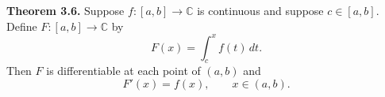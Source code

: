 \textbf{Theorem 3.6.}  Suppose $f: [a, b] \to \mathbb{C}$ is continuous and suppose $c \in [a, b]$. Define $F: [a, b] \to \mathbb{C}$ by
$$F(x) = \int_c^x f(t)\,dt.$$
Then $F$ is differentiable at each point of $(a, b)$ and
$$F'(x) = f(x), \qquad x \in (a, b).$$
